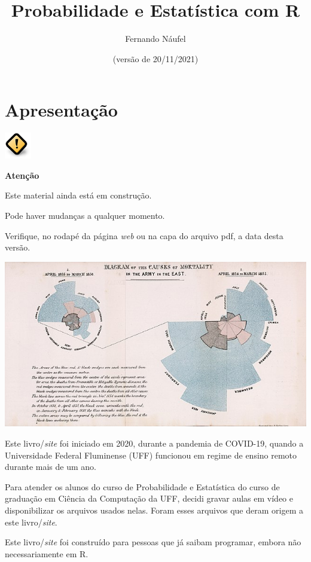 \documentclass[
  11pt]{report}
\title{Probabilidade e Estatística com R}
\author{Fernando Náufel}
\date{(versão de 20/11/2021)}
\newenvironment{rmdcaution}
{
  \begin{mycaution}
    \includegraphics{images/caution.png}
    \tcblower
  }
  {
  \end{mycaution}
}
\begin{document}
\maketitle

{
\setcounter{tocdepth}{1}
\tableofcontents
}
\hypertarget{apresentacao}{%
\chapter*{Apresentação}\label{apresentacao}}

\begin{rmdcaution}
\textbf{Atenção}

Este material ainda está em construção.

Pode haver mudanças a qualquer momento.

Verifique, no rodapé da página \emph{web} ou na capa do arquivo pdf, a data desta versão.

\end{rmdcaution}

\newpage

\includegraphics{images/640px-Nightingale-mortality.jpg}

\vspace{2cm}

Este livro/\emph{site} foi iniciado em 2020, durante a pandemia de COVID-19, quando a Universidade Federal Fluminense (UFF) funcionou em regime de ensino remoto durante mais de um ano.

Para atender os alunos do curso de Probabilidade e Estatística do curso de graduação em Ciência da Computação da UFF, decidi gravar aulas em vídeo e disponibilizar os arquivos usados nelas. Foram esses arquivos que deram origem a este livro/\emph{site}.

Este livro/\emph{site} foi construído para pessoas que já saibam programar, embora não necessariamente em R.
\end{document}
